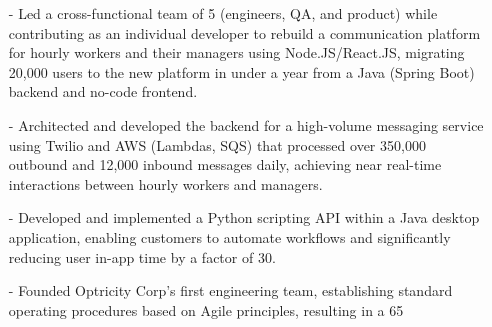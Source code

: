\documentclass[9pt]{developercv} %
\begin{document}
	\begin{itemize}
        
		\item[-] Led a cross-functional team of 5 (engineers, QA, and product) while contributing as an individual developer to rebuild a communication platform for hourly workers and their managers using Node.JS/React.JS, migrating 20,000 users to the new platform in under a year from a Java (Spring Boot) backend and no-code frontend.
	    
		\item[-] Architected and developed the backend for a high-volume messaging service using Twilio and AWS (Lambdas, SQS) that processed over 350,000 outbound and 12,000 inbound messages daily, achieving near real-time interactions between hourly workers and managers.
	    
		\item[-] Developed and implemented a Python scripting API within a Java desktop application, enabling customers to automate workflows and significantly reducing user in-app time by a factor of 30.
	    
		\item[-] Founded Optricity Corp's first engineering team, establishing standard operating procedures based on Agile principles, resulting in a 65%
	    
    \end{itemize}


\end{document}
